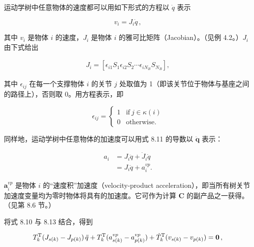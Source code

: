 \documentclass[10pt,a4paper]{book}
\theoremstyle{thmstyle} %
\theoremstyle{defstyle} %
\theoremstyle{prostyle} %
\begin{document}
运动学树中任意物体的速度都可以用如下形式的方程以 $\dot{q}$ 表示



$$
v _ { i } = J _ { i } \dot { q } \, ,
$$



其中 $v_{i}$ 是物体 $i$ 的速度，$J_{i}$ 是物体 $i$ 的雅可比矩阵（Jacobian）。（见例 4.2。）$J_{i}$ 由下式给出



$$
\begin{array}{r} { J _ { i } = \left[ \epsilon _ { i 1 } S _ { 1 }  \epsilon _ { i 2 } S _ { 2 }  \cdots  \epsilon _ { i N _ { B } } S _ { N _ { B } } \right] , } \end{array}
$$



其中 $\epsilon_{ij}$ 在每一个支撑物体 $i$ 的关节 $j$ 处取值为 1（即该关节位于物体与基座之间的路径上），否则取 0。用方程表示，即



$$
\epsilon _ { i j } = \left\{ \begin{array}{ll} { 1 } & { \mathrm { i f ~ } j \in \kappa ( i ) } \\{ 0 } & { \mathrm { o t h e r w i s e } . } \end{array} \right.
$$



同样地，运动学树中任意物体的加速度可以用式 8.11 的导数以 $\ddot{\boldsymbol{q}}$ 表示：



$$
\begin{array}{rl} { a _ { i } } & { { } = J _ { i } { \ddot { q } } + { \dot { J } } _ { i } { \dot { q } } } \\{ } & { { } = J _ { i } { \ddot { q } } + a _ { i } ^{v p} . } \end{array}
$$



$\boldsymbol{a}_{i}^{vp}$ 是物体 $i$ 的“速度积”加速度（velocity-product acceleration），即当所有树关节加速度变量均为零时物体将具有的加速度。它可作为计算 $\boldsymbol{C}$ 的副产品之一获得。（见第 8.6 节。）



将式 8.10 与 8.13 结合，得到



$$
T _ { k } ^{\mathrm { T} } ( J _ { s ( k ) } - J _ { p ( k ) } ) \, \ddot { q } + T _ { k } ^{\mathrm { T} } ( a _ { s ( k ) } ^{v p} - a _ { p ( k ) } ^{v p} ) + \dot { T } _ { k } ^{\mathrm { T} } ( v _ { s ( k ) } - v _ { p ( k ) } ) = { \bf 0 } \, ,
$$
\end{document}
